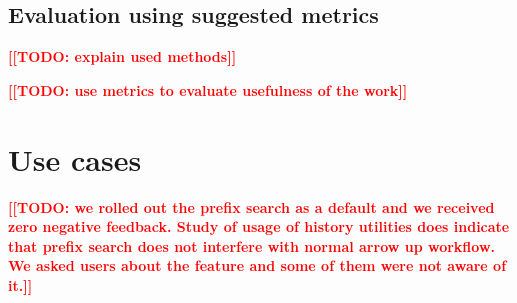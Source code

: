 \documentclass[thesis=M,english]{FITthesis}[2012/10/20]
\newcommand{\todotext}[1]{\textcolor{red}{\textbf{[[#1]]}}}
\begin{document}
\subsection{Evaluation using suggested metrics}

\todotext{TODO: explain used methods}

\todotext{TODO: use metrics to evaluate usefulness of the work}


\section{Use cases}

\todotext{TODO: we rolled out the prefix search as a default and we received zero negative feedback. Study of usage of history utilities does indicate that prefix search does not interfere with normal arrow up workflow. We asked users about the feature and some of them were not aware of it.}
\end{document}

